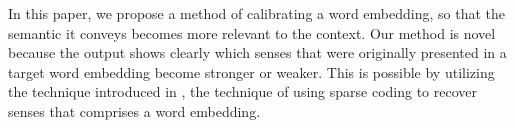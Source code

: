 In this paper, we propose a method of calibrating a word embedding, so that the semantic it conveys becomes more relevant to the context. Our method is novel because the output shows clearly which senses that were originally presented in a target word embedding become stronger or weaker. This is possible by utilizing the technique introduced in \cite{Murphy, Arora2016}, the technique of using sparse coding to recover senses that comprises a word embedding.
